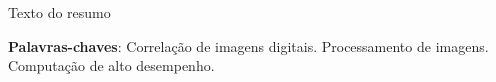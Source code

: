 \documentclass[
	12pt,				%
	oneside,			%
	a4paper,			%
	sumario=abnt-6027-2012, %
	chapter=TITLE, 	%
	english,			%
	french,				%
	spanish,			%
	brazil,				%
	]{abntex2}
\begin{document}
\imprimirfolhaderosto*

 \begin{fichacatalografica}
 \end{fichacatalografica}
 
\addtocounter{page}{-1}


 \begin{folhadeaprovacao}
 \end{folhadeaprovacao}
 
\addtocounter{page}{-1}


 
 
 
 
 
 
 
 

 	
 	


\newpage
\setlength{\absparsep}{18pt} %
\begin{resumo} 
\label{resumo}

Texto do resumo 

 \textbf{Palavras-chaves}: Correlação de imagens digitais. Processamento de imagens. Computação de alto desempenho.
\end{resumo}
\end{document}
